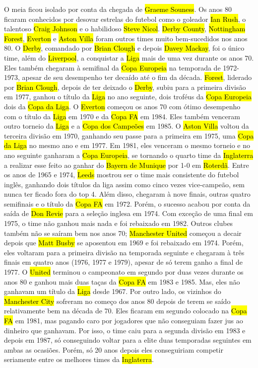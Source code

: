\documentclass[a4paper,12pt]{article}
\begin{document}
O meia ficou isolado por conta da chegada de \hl{Graeme Souness}. Os anos 80 ficaram conhecidos por desovar estrelas do futebol como o goleador \hl{Ian Rush}, o talentoso \hl{Craig Johnson} e o habilidoso \hl{Steve Nicol}.
\hl{Derby County}, \hl{Nottingham Forest}, \hl{Everton} e \hl{Aston Villa} foram outros times muito bem-sucedidos nos anos 80. O \hl{Derby}, comandado por \hl{Brian Clough} e depois \hl{Davey Mackay}, foi o único time, além do \hl{Liverpool}, a conquistar a \hl{Liga} mais de uma vez durante os anos 70. Eles também chegaram à semifinal da \hl{Copa Europeia} na temporada de 1972-1973, apesar de seu desempenho ter decaído até o fim da década. \hl{Forest}, liderado por \hl{Brian Clough}, depois de ter deixado o \hl{Derby}, subiu para a primeira divisão em 1977, ganhou o título da \hl{Liga} no ano seguinte, dois troféus da \hl{Copa Europeia} dois da \hl{Copa da Liga}. O \hl{Everton} começou os anos 70 com ótimo desempenho com o título da \hl{Liga} em 1970 e da \hl{Copa FA} em 1984. Eles também venceram outro torneio da \hl{Liga} e a \hl{Copa dos Campeões} em 1985. O \hl{Aston Villa} voltou da terceira divisão em 1970, ganhando seu passe para a primeira em 1975, uma \hl{Copa da Liga} no mesmo ano e em 1977. Em 1981, eles venceram o mesmo torneio e no ano seguinte ganharam a \hl{Copa Europeia}, se tornando o quarto time da \hl{Inglaterra} a realizar esse feito ao ganhar do \hl{Bayern de Munique} por 1-0 em \hl{Roterdã}.
Entre os anos de 1965 e 1974, \hl{Leeds} mostrou ser o time mais consistente do futebol inglês, ganhando dois títulos da liga assim como cinco vezes vice-campeão, sem nunca ter ficado fora do top 4. Além disso, chegaram à nove finais, outras quatro semifinais e o título da \hl{Copa FA} em 1972. Porém, o sucesso acabou por conta da saída de \hl{Don Revie} para a seleção inglesa em 1974. Com exceção de uma final em 1975, o time não ganhou mais nada e foi rebaixado em 1982.
Outros clubes também não se saíram bem nos anos 70; \hl{Manchester United} começou a decair depois que \hl{Matt Busby} se aposentou em 1969 e foi rebaixado em 1974. Porém, eles voltaram para a primeira divisão na temporada seguinte e chegaram à três finais em quatro anos (1976, 1977 e 1979), apesar de só terem ganho a final de 1977. O \hl{United} terminou o campeonato em segundo por duas vezes durante os anos 80 e ganhou mais duas taças da \hl{Copa FA} em 1983 e 1985. Mas, eles não ganhavam um título da \hl{Liga} desde 1967.
Por outro lado, os vizinhos do \hl{Manchester City} sofreram no começo dos anos 80 depois de terem se saído relativamente bem na década de 70. Eles ficaram em segundo colocado na \hl{Copa FA} em 1981, mas pagando caro por jogadores que não conseguiam fazer jus ao dinheiro que ganhavam. Por isso, o time caiu para a segunda divisão em 1983 e depois em 1987, só conseguindo voltar para a elite duas temporadas seguintes em ambas as ocasiões. Porém, só 20 anos depois eles conseguiriam competir seriamente entre os melhores times da \hl{Inglaterra}.
\end{document}
